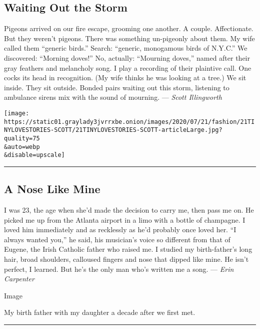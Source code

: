\hypertarget{waiting-out-the-storm}{%
\subsection{Waiting Out the Storm}\label{waiting-out-the-storm}}

Pigeons arrived on our fire escape, grooming one another. A couple.
Affectionate. But they weren't pigeons. There was something un-pigeonly
about them. My wife called them ``generic birds.'' Search: ``generic,
monogamous birds of N.Y.C.'' We discovered: ``Morning doves!'' No,
actually: ``Mourning doves,'' named after their gray feathers and
melancholy song. I play a recording of their plaintive call. One cocks
its head in recognition. (My wife thinks he was looking at a tree.) We
sit inside. They sit outside. Bonded pairs waiting out this storm,
listening to ambulance sirens mix with the sound of mourning. ---
\emph{Scott Illingworth}

\texttt{[image: https://static01.graylady3jvrrxbe.onion/images/2020/07/21/fashion/21TINYLOVESTORIES-SCOTT/21TINYLOVESTORIES-SCOTT-articleLarge.jpg?quality=75\\\&auto=webp\\\&disable=upscale]}

\begin{center}\rule{0.5\linewidth}{\linethickness}\end{center}

\hypertarget{a-nose-like-mine}{%
\subsection{A Nose Like Mine}\label{a-nose-like-mine}}

I was 23, the age when she'd made the decision to carry me, then pass me
on. He picked me up from the Atlanta airport in a limo with a bottle of
champagne. I loved him immediately and as recklessly as he'd probably
once loved her. ``I always wanted you,'' he said, his musician's voice
so different from that of Eugene, the Irish Catholic father who raised
me. I studied my birth-father's long hair, broad shoulders, calloused
fingers and nose that dipped like mine. He isn't perfect, I learned. But
he's the only man who's written me a song. --- \emph{Erin Carpenter}

Image

My birth father with my daughter a decade after we first met.

\begin{center}\rule{0.5\linewidth}{\linethickness}\end{center}

